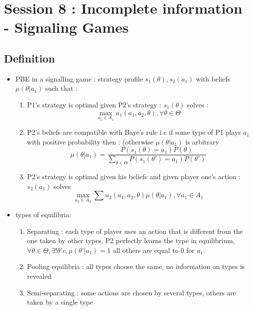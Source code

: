 \documentclass{article}
\begin{document}
\section{Session 8 : Incomplete information -  Signaling Games}

\subsection{Definition}
\begin{itemize}
    \item PBE in a signalling game : strategy profile $s_1(\theta),s_2(a_1)$ with beliefs $\mu(\theta|a_1)$ such that : 
    \begin{enumerate}
        \item P1's strategy is optimal given P2's strategy : $s_1(\theta)$ solves : 
        \begin{equation}
           \max_{a_1\in A_1}u_1(a_1,a_2,\theta), \forall\theta\in\Theta
        \end{equation}
        \item P2's beliefs are compatible with Baye's rule i.e if some type of P1 plays $a_1$ with positive probability then : (otherwise $\mu(\theta|a_1)$ is arbitrary
        \begin{equation}
            \mu(\theta|a_1) = \frac{P(s_1(\theta)=a_1)P(\theta)}{\sum_{\theta\in\Theta}P(s_1(\theta')=a_1)P(\theta')}
        \end{equation}
        \item P2's strategy is optimal given his beliefs and given player one's action : $s_2(a_1)$ solves 
        \begin{equation}
            \max_{a_2\in A_2} \sum u_2(a_1,a_2,\theta)\mu(\theta|a_1), \forall a_1\in A_1
        \end{equation}
    \end{enumerate}
    \item types of equilibria: 
    \begin{enumerate}
        \item Separating : each type of player uses an action that is different from the one taken by other types. P2 perfectly learns the type in equilibrium, $\forall \theta\in \Theta, \exists! \theta'c, \mu(\theta'|a_1)=1$ all others are equal to 0 for $a_1$.
        \item Pooling equilibria : all types choose the same, no information on types is revealed
        \item Semi-separating : some actions are chosen by several types, others are taken by a single type
    \end{enumerate}
\end{itemize}
\end{document}
